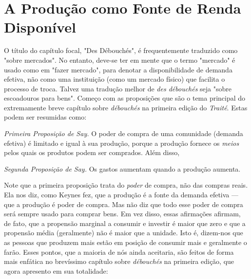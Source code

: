 \documentclass[12pt]{article}
\begin{document}
\section{A Produção como Fonte de Renda Disponível}

O título do capítulo focal, "Des Débouchés", é frequentemente traduzido como "sobre mercados". No entanto, deve-se ter em mente que o termo "mercado" é usado como em "fazer mercado", para denotar a disponibilidade de demanda efetiva, não como uma instituição (como um mercado físico) que facilita o processo de troca. Talvez uma tradução melhor de \textit{des débouchés} seja "sobre escoadouros para bens". Começo com as proposições que são o tema principal do extremamente breve capítulo sobre \textit{débouchés} na primeira edição do \textit{Traité}. Estas podem ser resumidas como:

\textit{Primeira Proposição de Say.} O poder de compra de uma comunidade (demanda efetiva) é limitado e igual à sua produção, porque a produção fornece os \textit{meios} pelos quais os produtos podem ser comprados. Além disso,

\textit{Segunda Proposição de Say.} Os gastos aumentam quando a produção aumenta.

Note que a primeira proposição trata do \textit{poder} de compra, não das compras reais. Ela nos diz, como Keynes fez, que a produção é a fonte da demanda efetiva — que a produção é poder de compra. Mas não diz que todo esse poder de compra será sempre usado para comprar bens. Em vez disso, essas afirmações afirmam, de fato, que a propensão marginal a consumir e investir é maior que zero e que a propensão média (geralmente) não é maior que a unidade. Isto é, dizem-nos que as pessoas que produzem mais estão em posição de consumir mais e geralmente o farão. Esses pontos, que a maioria de nós ainda aceitaria, são feitos de forma mais enfática no brevíssimo capítulo sobre \textit{débouchés} na primeira edição, que agora apresento em sua totalidade:
\end{document}
